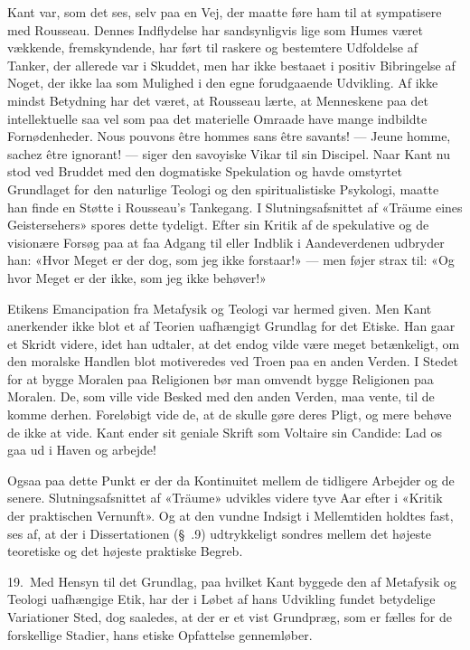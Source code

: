\documentclass[12pt,a4paper]{article}
\newcommand{\apage}[1]{\marginnote{\footnotesize\textit{[#1]}}}
\begin{document}
Kant var, som det ses, selv paa en Vej, der maatte føre ham til at
sympatisere med Rousseau. Dennes Indflydelse har sandsynligvis lige som
Humes været vækkende, fremskyndende, har ført til raskere og bestemtere
Udfoldelse af Tanker, der allerede var i Skuddet, men har ikke bestaaet i
positiv Bibringelse af Noget, der ikke laa som Mulighed i den egne
forudgaaende Udvikling. Af ikke mindst Betydning har det været, at
Rousseau lærte, at Menneskene paa det intellektuelle saa vel som paa det
materielle Omraade have mange indbildte Fornødenheder. Nous
pouvons être hommes sans être savants! --- Jeune homme, sachez
être ignorant! --- siger den savoyiske Vikar til sin Discipel. Naar Kant
nu stod ved Bruddet med den dogmatiske Spekulation og havde omstyrtet
Grundlaget for den naturlige Teologi og den spiritualistiske Psykologi,
maatte han finde en Støtte i Rousseau's Tankegang. I Slutningsafsnittet
af «Träume eines Geistersehers» spores dette tydeligt. Efter sin Kritik
af de spekulative og de visionære Forsøg paa at faa Adgang til eller
Indblik i Aandeverdenen udbryder han: «Hvor Meget er der dog, som jeg
ikke forstaar!» --- men føjer strax til: «Og hvor Meget er der ikke, som
jeg ikke behøver!»

Etikens Emancipation fra Metafysik og Teologi var hermed given. Men Kant
anerkender ikke blot et af Teorien uafhængigt Grundlag for det Etiske.
Han gaar et Skridt videre, idet han udtaler, at det endog vilde være
meget betænkeligt, om den moralske Handlen blot motiveredes ved Troen paa
en anden Verden. I Stedet for at bygge Moralen paa Religionen bør man
omvendt bygge Religionen paa Moralen. De, som ville vide Besked med den
anden Verden, maa vente, til de komme derhen. Foreløbigt \apage{39}  vide de, at de
skulle gøre deres Pligt, og mere behøve de ikke at vide. Kant ender sit
geniale Skrift som Voltaire sin Candide: Lad os gaa ud i Haven og
arbejde!

Ogsaa paa dette Punkt er der da Kontinuitet mellem de tidligere Arbejder
og de senere. Slutningsafsnittet af «Träume» udvikles videre tyve Aar
efter i «Kritik der praktischen Vernunft». Og at den vundne Indsigt i
Mellemtiden holdtes fast, ses af, at der i Dissertationen (§\ .9)
udtrykkeligt sondres mellem det højeste teoretiske og det højeste
praktiske Begreb.

19.\ Med Hensyn til det Grundlag, paa hvilket Kant byggede den af
Metafysik og Teologi uafhængige Etik, har der i Løbet af hans Udvikling
fundet betydelige Variationer Sted, dog saaledes, at der er et vist
Grundpræg, som er fælles for de forskellige Stadier, hans etiske
Opfattelse gennemløber.
\end{document}
